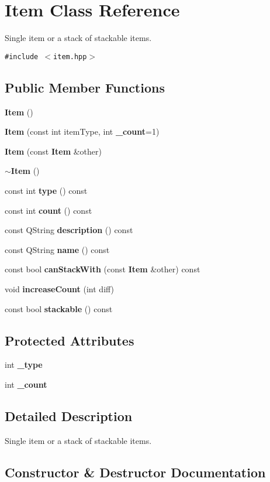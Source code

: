 \section{Item Class Reference}
\label{classItem}
Single item or a stack of stackable items.  


{\tt \#include $<$item.hpp$>$}

\subsection*{Public Member Functions}
\begin{CompactItemize}
\item 
{\bf Item} ()
\item 
{\bf Item} (const int item\-Type, int {\bf \_\-count}=1)
\item 
{\bf Item} (const {\bf Item} \&other)
\item 
{\bf $\sim$Item} ()
\item 
const int {\bf type} () const 
\item 
const int {\bf count} () const 
\item 
const QString {\bf description} () const 
\item 
const QString {\bf name} () const 
\item 
const bool {\bf can\-Stack\-With} (const {\bf Item} \&other) const 
\item 
void {\bf increase\-Count} (int diff)
\item 
const bool {\bf stackable} () const 
\end{CompactItemize}
\subsection*{Protected Attributes}
\begin{CompactItemize}
\item 
int {\bf \_\-type}
\item 
int {\bf \_\-count}
\end{CompactItemize}


\subsection{Detailed Description}
Single item or a stack of stackable items. 



\subsection{Constructor \& Destructor Documentation}

